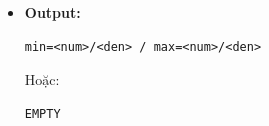 \begin{itemize}
\begin{itemize}
        \item \textbf{Module 3 (So sánh phân số):}
        \begin{itemize}
            \item
            \begin{lstlisting}
a/b < c/d <=> a*d < c*b
            \end{lstlisting}
            \item Dùng \texttt{\_\_int128} tránh tràn số
        \end{itemize}

        \item \textbf{Module 4 (Tìm min, max):}
        \begin{itemize}
            \item Duyệt danh sách hợp lệ 1 lần
            \item Cập nhật nhỏ nhất và lớn nhất
        \end{itemize}
    \end{itemize}

    \item \textbf{Output:}
    \begin{lstlisting}
min=<num>/<den> / max=<num>/<den>
    \end{lstlisting}
    Hoặc:
    \begin{lstlisting}
EMPTY
    \end{lstlisting}
\end{itemize}

